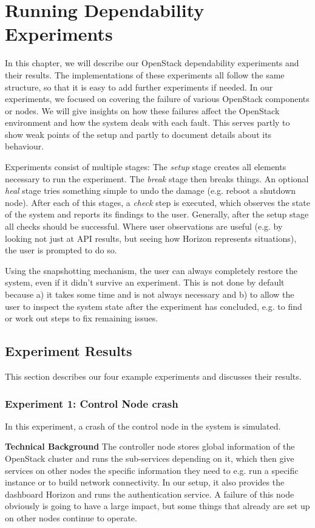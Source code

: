 \documentclass[conference]{IEEEtran}
\begin{document}
\section{Running Dependability Experiments}
\label{experiments}
In this chapter, we will describe our OpenStack dependability experiments and their results. The implementations of these experiments all follow the same structure, so that it is easy to add further experiments if needed. In our experiments, we focused on covering the failure of various OpenStack components or nodes. We will give insights on how these failures affect the OpenStack environment and how the system deals with each fault. This serves partly to show weak points of the setup and partly to document details about its behaviour.

Experiments consist of multiple stages: The \emph{setup} stage creates all elements necessary to run the experiment. The \emph{break} stage then breaks things. An optional \emph{heal} stage tries something simple to undo the damage (e.g. reboot a shutdown node). After each of this stages, a \emph{check} step is executed, which observes the state of the system and reports its findings to the user. Generally, after the setup stage all checks should be successful. Where user observations are useful (e.g. by looking not just at API results, but seeing how Horizon represents situations), the user is prompted to do so.

Using the snapshotting mechanism, the user can always completely restore the system, even if it didn't survive an experiment. This is not done by default because a) it takes some time and is not always necessary and b) to allow the user to inspect the system state after the experiment has concluded, e.g. to find or work out steps to fix remaining issues.

\subsection{Experiment Results}
This section describes our four example experiments and discusses their results. 

\subsubsection{Experiment 1: Control Node crash}
In this experiment, a crash of the control node in the system is simulated. 

\textbf{Technical Background}
The controller node stores global information of the OpenStack cluster and runs the sub-services depending on it, which then give services on other nodes the specific information they need to e.g. run a specific instance or to build network connectivity. In our setup, it also provides the dashboard Horizon and runs the authentication service. A failure of this node obviously is going to have a large impact, but some things that already are set up on other nodes continue to operate.
\end{document}
